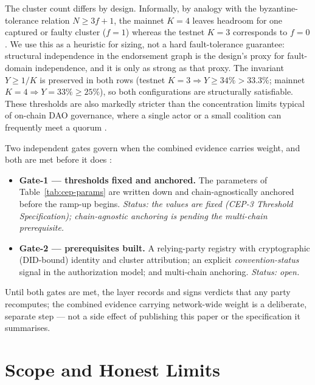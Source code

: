 The cluster count differs by design. Informally, by analogy with the byzantine-tolerance relation $N \ge 3f+1$, the mainnet $K = 4$ leaves headroom for one captured or faulty cluster ($f = 1$) whereas the testnet $K = 3$ corresponds to $f = 0$. We use this as a heuristic for sizing, not a hard fault-tolerance guarantee: structural independence in the endorsement graph is the design's proxy for fault-domain independence, and it is only as strong as that proxy. The invariant $Y \ge 1/K$ is preserved in both rows (testnet $K = 3 \Rightarrow Y \ge 34\% > 33.3\%$; mainnet $K = 4 \Rightarrow Y = 33\% \ge 25\%$), so both configurations are structurally satisfiable. These thresholds are also markedly stricter than the concentration limits typical of on-chain DAO governance, where a single actor or a small coalition can frequently meet a quorum \cite{ref39_daogov}.

Two independent gates govern when the combined evidence carries weight, and both are met before it does \cite{ref28_techspec}:

\begin{itemize}
  \item \textbf{Gate-1 — thresholds fixed and anchored.} The parameters of Table~\ref{tab:cep-params} are written down and chain-agnostically anchored before the ramp-up begins. \emph{Status: the values are fixed (CEP-3 Threshold Specification); chain-agnostic anchoring is pending the multi-chain prerequisite.}
  \item \textbf{Gate-2 — prerequisites built.} A relying-party registry with cryptographic (DID-bound) identity and cluster attribution; an explicit \emph{convention-status} signal in the authorization model; and multi-chain anchoring. \emph{Status: open.}
\end{itemize}

Until both gates are met, the layer records and signs verdicts that any party recomputes; the combined evidence carrying network-wide weight is a deliberate, separate step — not a side effect of publishing this paper or the specification it summarises.

\section{Scope and Honest Limits}
\label{sec:scope}

